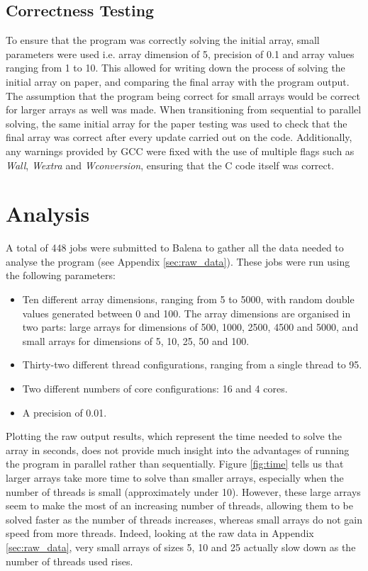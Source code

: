 \documentclass[letterpaper,12pt]{article}
\begin{document}
\subsection{Correctness Testing}

To ensure that the program was correctly solving the initial array, small parameters were used i.e. array dimension of 5, precision of 0.1 and array values ranging from 1 to 10. This allowed for writing down the process of solving the initial array on paper, and comparing the final array with the program output. The assumption that the program being correct for small arrays would be correct for larger arrays as well was made. When transitioning from sequential to parallel solving, the same initial array for the paper testing was used to check that the final array was correct after every update carried out on the code. Additionally, any warnings provided by GCC were fixed with the use of multiple flags such as \textit{Wall}, \textit{Wextra} and \textit{Wconversion}, ensuring that the C code itself was correct.



\section{Analysis}
\label{sec:analysis}

A total of 448 jobs were submitted to Balena to gather all the data needed to analyse the program (see Appendix \ref{sec:raw_data}). These jobs were run using the following parameters:
\begin{itemize}
    \item Ten different array dimensions, ranging from 5 to 5000, with random double values generated between 0 and 100. The array dimensions are organised in two parts: large arrays for dimensions of 500, 1000, 2500, 4500 and 5000, and small arrays for dimensions of 5, 10, 25, 50 and 100.
    \item Thirty-two different thread configurations, ranging from a single thread to 95.
    \item Two different numbers of core configurations: 16 and 4 cores.
    \item A precision of 0.01.
\end{itemize}

Plotting the raw output results, which represent the time needed to solve the array in seconds, does not provide much insight into the advantages of running the program in parallel rather than sequentially. Figure \ref{fig:time} tells us that larger arrays take more time to solve than smaller arrays, especially when the number of threads is small (approximately under 10). However, these large arrays seem to make the most of an increasing number of threads, allowing them to be solved faster as the number of threads increases, whereas small arrays do not gain speed from more threads. Indeed, looking at the raw data in Appendix \ref{sec:raw_data}, very small arrays of sizes 5, 10 and 25 actually slow down as the number of threads used rises.\\
\end{document}
